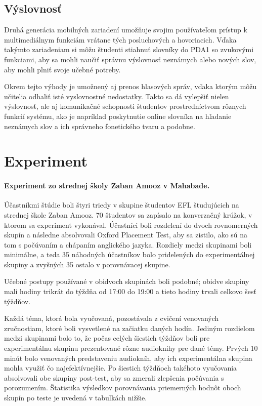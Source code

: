 \documentclass[10pt,oneside,slovak,a4paper]{article}
\begin{document}
\subsection{Výslovnosť} \label{mall:vyslovnost}

Druhá generácia mobilných zariadení umožňuje svojim používateľom prístup k multimediálnym funkciám vrátane tých posluchových a hovoriacich\cite{Miangah2012}. Vďaka takýmto zariadeniam si môžu študenti stiahnuť slovníky do PDA1 so zvukovými funkciami, aby sa mohli naučiť správnu výslovnosť neznámych alebo nových slov, aby mohli plniť svoje učebné potreby\cite{Miangah2012}.

Okrem tejto výhody je umožnený aj prenos hlasových správ, vďaka ktorým môžu učitelia odhaliť isté vyslovnostné nedostatky. Takto sa dá vylepšiť nielen výslovnosť, ale aj komunikačné schopnosti študentov prostredníctvom rôznych funkcií systému, ako je napríklad poskytnutie online slovníka na hľadanie neznámych slov a ich správneho fonetického tvaru a podobne\cite{Miangah2012}.



\section{Experiment} \label{experiment}

\paragraph{Experiment zo strednej školy Zaban Amooz v Mahabade\cite{Azar2014}.} Účastníkmi štúdie boli štyri triedy v skupine študentov EFL študujúcich na strednej škole Zaban Amooz. 70 študentov sa zapísalo na konverzačný krúžok, v ktorom sa experiment vykonával. Účastníci boli rozdelení do dvoch rovnomerných skupín a následne absolvovali Oxford Placement Test, aby sa zistilo, ako sú na tom s počúvaním a chápaním anglického jazyka. Rozdiely medzi skupinami boli minimálne, a teda 35 náhodných účastníkov bolo pridelených do experimentálnej skupiny a zvyšných 35 ostalo v porovnávacej skupine.

Učebné postupy používané v obidvoch skupinách boli podobné; obidve skupiny mali hodiny trikrát do týždňa od 17:00 do 19:00 a tieto hodiny trvali celkovo šesť týždňov.

Každá téma, ktorá bola vyučovaná, pozostávala z cvičení venovaných zručnostiam, ktoré boli vysvetlené na začiatku daných hodín. Jediným rozdielom medzi skupinami bolo to, že počas celých šiestich týždňov boli pre experimentálnu skupinu prezentované rôzne audioknihy pre dané témy. Prvých 10 minút bolo venovaných predstaveniu audiokníh, aby ich experimentálna skupina mohla využiť čo najefektívnejšie. Po šiestich týždňoch takéhoto vyučovania absolvovali obe skupiny post-test, aby sa zmerali zlepšenia počúvania s porozumením. Štatistika výsledkov porovnávania priemerných hodnôt oboch skupín po teste je uvedená v tabuľkách nižšie.\\
\end{document}
